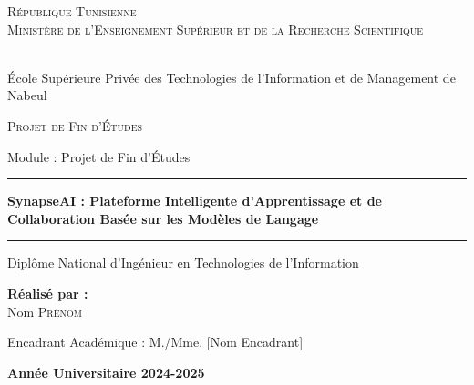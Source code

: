 \documentclass[a4paper, oneside, 12pt, final]{extreport}
\title{\reportSubject}
\author{\reportAuthor}
\newcommand{\reportTitle} {%
  \textsc{Projet de Fin d'\'Etudes}
}
\newcommand{\reportAuthor} {%
  Nom \textsc{Prénom}%
}
\newcommand{\reportSubject} {%
  SynapseAI : Plateforme Intelligente d'Apprentissage et de Collaboration Basée sur les Modèles de Langage%
}
\newcommand{\reportDiploma} {%
  Diplôme National d'Ingénieur en Technologies de l'Information%
}
\newcommand{\reportModule} {%
  Module : Projet de Fin d'Études%
}
\newcommand{\reportSupervisor} {%
  Encadrant Académique : M./Mme. [Nom Encadrant]%
}
\newcommand{\ITBS} {%
\\ École Supérieure Privée des Technologies de l'Information et de Management de Nabeul
}
\newcommand{\AU} {%
\centering \textbf{Année Universitaire 2024-2025}
}
\begin{document}
\thispagestyle{empty}
\begin{titlepage}
\begin{center}


\vspace{0.5cm}

{%
  \fontsize{9pt}{9pt}\selectfont%
  \textsc{République Tunisienne}\\%
  \textsc{Ministère de l'Enseignement Supérieur et de la Recherche Scientifique}\\%
}%
\vspace{0.3cm}%

{%
  \fontsize{10pt}{10pt}\selectfont%
  \ITBS%
}%
\vspace{0.5cm}


\vspace{1cm}

{%
  \fontsize{14pt}{14pt}\selectfont%
  \reportTitle%
}%
\vspace{0.5cm}

{%
  \fontsize{11pt}{11pt}\selectfont%
  \reportModule%
}%

\vspace{1.5cm}

\rule{14cm}{1pt}
\vspace{0.3cm}

{%
  \fontsize{16pt}{16pt}\selectfont%
  \textbf{\reportSubject}%
}%

\vspace{0.3cm}
\rule{14cm}{1pt}

\vspace{1.5cm}

{%
  \fontsize{12pt}{12pt}\selectfont%
  \reportDiploma%
}%

\vspace{1cm}

{%
  \fontsize{11pt}{11pt}\selectfont%
  \textbf{Réalisé par :}\\%
  \reportAuthor%
}%

\vspace{0.8cm}

{%
  \fontsize{11pt}{11pt}\selectfont%
  \reportSupervisor%
}%

\vspace{1cm}

{%
  \fontsize{11pt}{11pt}\selectfont%
  \AU%
}%

\end{center}
\end{titlepage}
\end{document}
